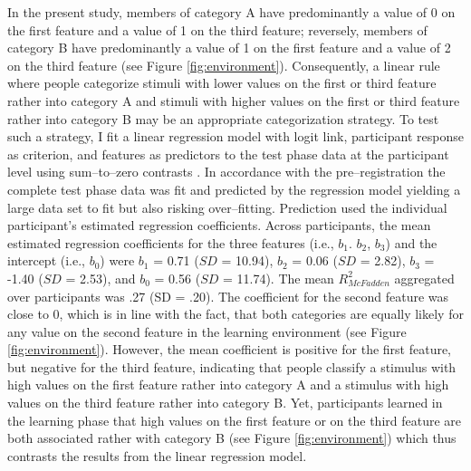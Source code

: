 \documentclass[a4paper,man,natbib]{apa6}
\begin{document}
In the present study, members of category A have predominantly a value of 0 on the first feature and a value of 1 on the third feature; reversely, members of category B have predominantly a value of 1 on the first feature and a value of 2 on the third feature (see Figure \ref{fig:environment}). Consequently, a linear rule where people categorize stimuli with lower values on the first or third feature rather into category A and stimuli with higher values on the first or third feature rather into category B may be an appropriate categorization strategy. To test such a strategy, I fit a linear regression model with logit link, participant response as criterion, and features as predictors to the test phase data at the participant level using sum--to--zero contrasts \citep{singmann2017introduction}. In accordance with the pre--registration the complete test phase data was fit and predicted by the regression model yielding a large data set to fit but also risking over--fitting. Prediction used the individual participant's estimated regression coefficients. Across participants, the mean estimated regression coefficients for the three features (i.e., $b_1$. $b_2$, $b_3$) and the intercept (i.e., $b_0$) were $b_1$ = 0.71 ($SD$ = 10.94), $b_2$ = 0.06 ($SD$ = 2.82), $b_3$ = -1.40 ($SD$ = 2.53), and $b_0$ = 0.56 ($SD$ = 11.74). The mean $R_{McFadden}^2$ aggregated over participants was .27 (SD = .20). 
The coefficient for the second feature was close to 0, which is in line with the fact, that both categories are equally likely for any value on the second feature in the learning environment (see Figure \ref{fig:environment}). However, the mean coefficient is positive for the first feature, but negative for the third feature, indicating that people classify a stimulus with high values on the first feature rather into category A and a stimulus with high values on the third feature rather into category B. Yet, participants learned in the learning phase that high values on the first feature or on the third feature are both associated rather with category B (see Figure \ref{fig:environment}) which thus contrasts the results from the linear regression model.
\end{document}
